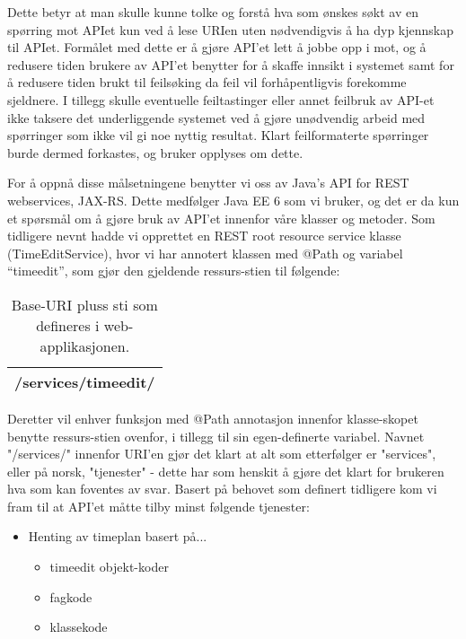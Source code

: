 \documentclass[../main.tex]{subfiles}
\begin{document}
Dette betyr at man skulle kunne tolke og forstå hva som ønskes søkt av en spørring mot APIet kun ved å lese URIen uten nødvendigvis å ha dyp kjennskap til APIet. Formålet med dette er å gjøre API’et lett å jobbe opp i mot, og å redusere tiden brukere av API’et benytter for å skaffe innsikt i systemet samt for å redusere tiden brukt til feilsøking da feil vil forhåpentligvis forekomme sjeldnere.
I tillegg skulle eventuelle feiltastinger eller annet feilbruk av API-et ikke taksere det underliggende systemet ved å gjøre unødvendig arbeid med spørringer som ikke vil gi noe nyttig resultat. Klart feilformaterte spørringer burde dermed forkastes, og bruker opplyses om dette.

For å oppnå disse målsetningene benytter vi oss av Java’s API for REST webservices, JAX-RS. Dette medfølger Java EE 6 som vi bruker, og det er da kun et spørsmål om å gjøre bruk av API’et innenfor våre klasser og metoder.
Som tidligere nevnt hadde vi opprettet en REST root resource service klasse (TimeEditService), hvor vi har annotert klassen med @Path og variabel “timeedit”, som gjør den gjeldende ressurs-stien til følgende:
\begin{table}[H]
\begin{center}
\caption{Base-URI pluss sti som defineres i web-applikasjonen.}
\begin{tabular}{| p{12cm} |}
\hline
 [SERVERPATH]/services/timeedit/ \\ \hline
\end{tabular}
\end{center}
\end{table}
Deretter vil enhver funksjon med @Path annotasjon innenfor klasse-skopet benytte ressurs-stien ovenfor, i tillegg til sin egen-definerte variabel. Navnet "/services/" innenfor URI'en gjør det klart at alt som etterfølger er "services", eller på norsk, "tjenester" - dette har som henskit å gjøre det klart for brukeren hva som kan foventes av svar.\newline
Basert på behovet som definert tidligere kom vi fram til at API’et måtte tilby minst følgende tjenester:

\begin{itemize}
\item Henting av timeplan basert på...
\begin{itemize}
\item timeedit objekt-koder
\item fagkode
\item klassekode
\end{itemize}
\end{itemize}
\end{document}
